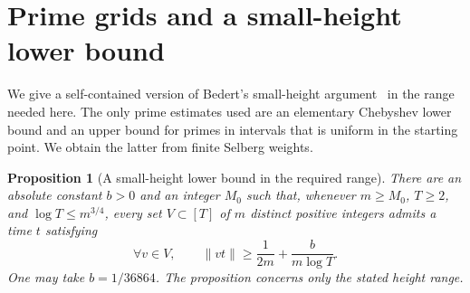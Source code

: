 \documentclass[12pt,leqno]{article}
\numberwithin{equation}{section}
\newtheorem{proposition}[theorem]{Proposition}
\theoremstyle{remark}
\begin{document}
\section{Prime grids and a small-height lower bound}
We give a self-contained version of Bedert's small-height argument~\cite[Proposition 2.5 and the end of Section 5]{Bedert} in the range needed here. The only prime estimates used are an elementary Chebyshev lower bound and an upper bound for primes in intervals that is uniform in the starting point. We obtain the latter from finite Selberg weights.

\begin{proposition}[A small-height lower bound in the required range]\label{prop:smallheight}
There are an absolute constant $b>0$ and an integer $M_0$ such that, whenever $m\ge M_0$, $T\ge2$, and $\log T\le m^{3/4}$, every set $V\subset[T]$ of $m$ distinct positive integers admits a time $t$ satisfying
\begin{equation}\label{eq:height}
\forall v\in V,\qquad \|vt\|\ge\frac1{2m}+\frac b{m\log T}.
\end{equation}
One may take $b=1/36864$. The proposition concerns only the stated height range.
\end{proposition}
\end{document}
